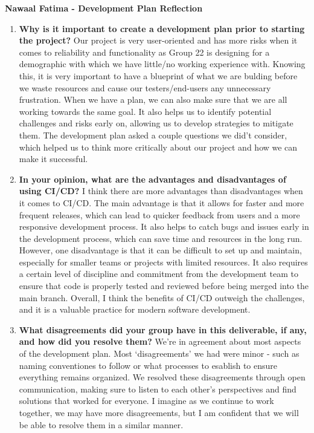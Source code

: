 \textbf{Nawaal Fatima - Development Plan Reflection}
\begin{enumerate}
    \item  \textbf{Why is it important to create a development plan prior to starting the
    project?} \newline
    Our project is very user-oriented and has more risks when it comes to reliability and functionality as Group 22 is designing for a demographic with which we have little/no working experience with.
    Knowing this, it is very important to have a blueprint of what we are bulding before we waste resources and cause our testers/end-users any unnecessary frustration. 
    When we have a plan, we can also make sure that we are all working towards the same goal. It also helps us to identify potential challenges and risks early on, allowing us to develop strategies to mitigate them.
    The development plan asked a couple questions we did't consider, which helped us to think more critically about our project and how we can make it successful.
    
    \item \textbf{In your opinion, what are the advantages and disadvantages of using
    CI/CD?} \newline
    I think there are more advantages than disadvantages when it comes to CI/CD.
    The main advantage is that it allows for faster and more frequent releases, which can lead to quicker feedback from users and a more responsive development process.
    It also helps to catch bugs and issues early in the development process, which can save time and resources in the long run.
    However, one disadvantage is that it can be difficult to set up and maintain, especially for smaller teams or projects with limited resources.
    It also requires a certain level of discipline and commitment from the development team to ensure that code is properly tested and reviewed before being merged into the main branch.
    Overall, I think the benefits of CI/CD outweigh the challenges, and it is a valuable practice for modern software development.

    \item \textbf{What disagreements did your group have in this deliverable, if any,
    and how did you resolve them?}\newline
    We're in agreement about most aspects of the development plan. Most `disagreements' we had were minor - such as naming conventiones to follow or what processes to esablish to ensure everything remains organized.
    We resolved these disagreements through open communication, making sure to listen to each other's perspectives and find solutions that worked for everyone.
    I imagine as we continue to work together, we may have more disagreements, but I am confident that we will be able to resolve them in a similar manner.
\end{enumerate}
